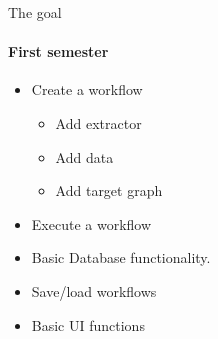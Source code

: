 \begin{frame}{The goal}
\framesubtitle{First semester}
	\begin{itemize}
		\item Create a workflow
		\begin{itemize}
			\item Add extractor
			\item Add data
			\item Add target graph
		\end{itemize}
		\item Execute a workflow
		\item Basic Database functionality.
		\item Save/load workflows
		\item Basic UI functions
	\end{itemize}
\end{frame}